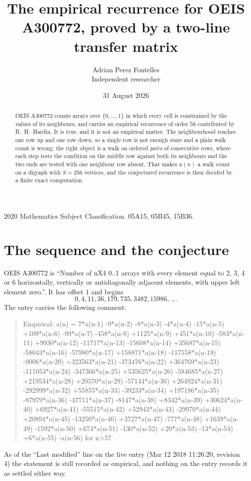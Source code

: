 \documentclass[11pt,a4paper]{article}
\title{The empirical recurrence for OEIS A300772, proved by a two-line transfer matrix}
\author{Adrian Perez Fontelles\\ \small Independent researcher}
\date{31 August 2026}
\theoremstyle{plain}
\theoremstyle{definition}
\begin{document}
\maketitle

\begin{abstract}
OEIS A300772 counts arrays over $\{0,\dots,1\}$ in which every cell is constrained by the
values of its neighbours, and carries an empirical recurrence of order $56$ contributed
by R.~H.~Hardin. It is true, and it is not an empirical matter. The neighbourhood reaches one
row up and one row down, so a single row is not enough state and a plain walk count
is wrong; the right object is a walk on ordered \emph{pairs} of consecutive rows, where
each step tests the condition on the middle row against both its neighbours and the two
ends are tested with one neighbour row absent. That makes $a(n)$ a walk count on a digraph
with $S=256$ vertices, and the conjectured recurrence is then decided by a finite exact
computation.
\end{abstract}

\noindent\small 2020 Mathematics Subject Classification. 05A15, 05B45, 15B36.\normalsize

\section{The sequence and the conjecture}

OEIS A300772 is ``Number of nX4 0..1 arrays with every element equal to 2, 3, 4 or 6 horizontally, vertically or antidiagonally adjacent elements, with upper left element zero.''. It has offset $1$ and begins
\[
0, 4, 11, 36, 179, 735, 3482, 15986,\ \dots
\]
The entry carries the following comment:
\begin{quote}\small
Empirical: a(n) = 7*a(n-1) -9*a(n-2) -8*a(n-3) -4*a(n-4) -15*a(n-5) +109*a(n-6) -99*a(n-7) -458*a(n-8) +1125*a(n-9) +451*a(n-10) -583*a(n-11) +9930*a(n-12) -11717*a(n-13) -15608*a(n-14) +35687*a(n-15) -58043*a(n-16) -57980*a(n-17) +158871*a(n-18) -117558*a(n-19) -9006*a(n-20) +323563*a(n-21) -373476*a(n-22) +364769*a(n-23) -111053*a(n-24) -347366*a(n-25) +535625*a(n-26) -584685*a(n-27) +219534*a(n-28) +20570*a(n-29) -57144*a(n-30) +264924*a(n-31) -292999*a(n-32) +55855*a(n-33) -39233*a(n-34) +197186*a(n-35) -87979*a(n-36) -47711*a(n-37) -8147*a(n-38) +8342*a(n-39) +30624*a(n-40) +6927*a(n-41) -55515*a(n-42) +52943*a(n-43) -29970*a(n-44) +20894*a(n-45) -13250*a(n-46) +3727*a(n-47) -777*a(n-48) +1639*a(n-49) -1592*a(n-50) +674*a(n-51) -130*a(n-52) +20*a(n-53) -13*a(n-54) +6*a(n-55) -a(n-56) for n>57
\end{quote}
As of the ``Last modified'' line on the live entry (Mar 12 2018 11:26:20, revision 4) the statement is
still recorded as empirical, and nothing on the entry records it as settled either way.
\end{document}
